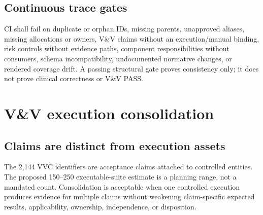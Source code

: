 \documentclass[11pt,letterpaper]{article}
\begin{document}
\subsection{Continuous trace gates}

CI shall fail on duplicate or orphan IDs, missing parents, unapproved aliases, missing allocations or owners, V\&V claims without an execution/manual binding, risk controls without evidence paths, component responsibilities without consumers, schema incompatibility, undocumented normative changes, or rendered coverage drift. A passing structural gate proves consistency only; it does not prove clinical correctness or V\&V PASS.

\section{V\&V execution consolidation}

\subsection{Claims are distinct from execution assets}

The 2,144 VVC identifiers are acceptance claims attached to controlled entities. The proposed 150--250 executable-suite estimate is a planning range, not a mandated count. Consolidation is acceptable when one controlled execution produces evidence for multiple claims without weakening claim-specific expected results, applicability, ownership, independence, or disposition.
\end{document}
